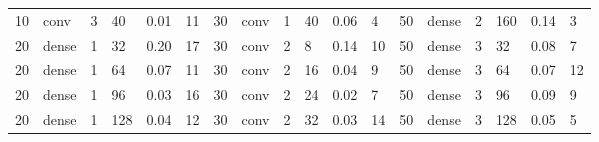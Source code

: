 \begin{table}
{\begin{tabular}{@{}llllll|llllll|llllll@{}}
10                              & conv                           & 3                              & 40                             & 0.01                             & 11                                & 30                              & conv                           & 1                              & 40                             & 0.06                           & 4                                 & 50                              & dense                          & 2                              & 160                            & 0.14                           & 3                                \\
20                              & dense                          & 1                              & 32                             & 0.20                             & 17                                & 30                              & conv                           & 2                              & 8                              & 0.14                           & 10                                & 50                              & dense                          & 3                              & 32                             & 0.08                           & 7                                \\
20                              & dense                          & 1                              & 64                             & 0.07                             & 11                                & 30                              & conv                           & 2                              & 16                             & 0.04                           & 9                                 & 50                              & dense                          & 3                              & 64                             & 0.07                           & 12                               \\
20                              & dense                          & 1                              & 96                             & 0.03                             & 16                                & 30                              & conv                           & 2                              & 24                             & 0.02                           & 7                                 & 50                              & dense                          & 3                              & 96                             & 0.09                           & 9                                \\
20                              & dense                          & 1                              & 128                            & 0.04                             & 12                                & 30                              & conv                           & 2                              & 32                             & 0.03                           & 14                                & 50                              & dense                          & 3                              & 128                            & 0.05                           & 5                                \\

\end{tabular}}
\end{table}
